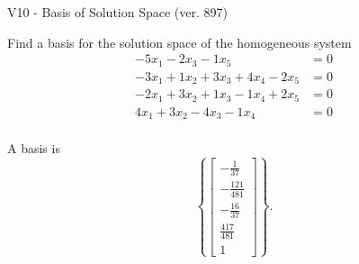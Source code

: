 \begin{exercise}
  \begin{exerciseTitle}V10 - Basis of Solution Space (ver. 897)\end{exerciseTitle}
  \begin{exerciseStatement}
    Find a basis for the solution space of the homogeneous system 
\begin{align*}
 -5 x_ 1 -2 x_ 3 -1 x_ 5 &= 0  \\ 
  -3 x_ 1 + 1 x_ 2 + 3 x_ 3 + 4 x_ 4 -2 x_ 5 &= 0  \\ 
  -2 x_ 1 + 3 x_ 2 + 1 x_ 3 -1 x_ 4 + 2 x_ 5 &= 0  \\ 
  4 x_ 1 + 3 x_ 2 -4 x_ 3 -1 x_ 4 &= 0  \\ 
 \end{align*}


 
  \end{exerciseStatement}

  \begin{exerciseAnswer}
   A basis is   
\[\left\{\left[\begin{array}{c}
-\frac{1}{37} \\
-\frac{121}{481} \\
-\frac{16}{37} \\
\frac{417}{481} \\
1
\end{array}\right]\right\}.\]

  


  \end{exerciseAnswer}
\end{exercise}